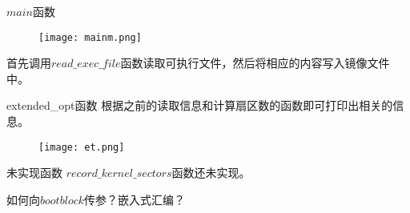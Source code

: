 \documentclass{beamer}
\begin{document}
\begin{frame}{$main$函数}
\begin{figure}
	
	\centering\texttt{[image: mainm.png]}
\end{figure}
首先调用$read\_exec\_file$函数读取可执行文件，然后将相应的内容写入镜像文件中。
\end{frame}

\begin{frame}{extended\_opt函数}
根据之前的读取信息和计算扇区数的函数即可打印出相关的信息。
\begin{figure}
	
	\centering\texttt{[image: et.png]}
\end{figure}
\end{frame}

\begin{frame}{未实现函数}
$record\_kernel\_sectors$函数还未实现。

如何向$bootblock$传参？嵌入式汇编？


\end{frame}
\end{document}
